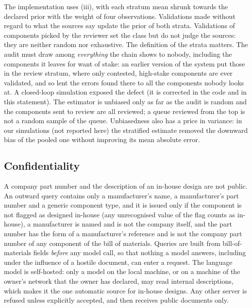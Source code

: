 The implementation uses (iii), with each stratum mean shrunk towards the declared prior with the weight of four
observations. Validations made without regard to what the sources say update the prior of both strata. Validations
of components picked by the reviewer set the class but do not judge the sources: they are neither random nor
exhaustive. The definition of the strata matters. The audit must draw among \emph{everything} the chain shows to
nobody, including the components it leaves for want of stake: an earlier version of the system put those in the
review stratum, where only contested, high-stake components are ever validated, and so lent the errors found there
to all the components nobody looks at. A closed-loop simulation exposed the defect (it is corrected in the code and
in this statement). The estimator is unbiased only as far as the audit is random and the components sent to review
are all reviewed; a queue reviewed from the top is not a random sample of the queue. Unbiasedness also has a price
in variance: in our simulations (not reported here) the stratified estimate removed the downward bias of the pooled
one without improving its mean absolute error.

\subsection{Confidentiality}\label{sec:confidentiality}

A company part number and the description of an in-house design are not public. An outward query contains only a
manufacturer's name, a manufacturer's part number and a generic component type, and it is issued only if the
component is not flagged as designed in-house (any unrecognised value of the flag counts as in-house), a
manufacturer is named and is not the company itself, and the part number has the form of a manufacturer's reference
and is not the company part number of any component of the bill of materials. Queries are built from
bill-of-materials fields \emph{before} any model call, so that nothing a model answers, including under the
influence of a hostile document, can enter a request. The language model is self-hosted: only a model on the local
machine, or on a machine of the owner's network that the owner has declared, may read internal descriptions, which
makes it the one automatic source for in-house designs. Any other server is refused unless explicitly accepted, and
then receives public documents only.
